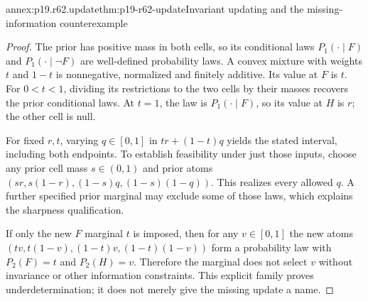 \begin{annexitem}{annex:p19.r62.update}{thm:p19-r62-update}{Invariant updating and the missing-information counterexample}
\begin{proof}
The prior has positive mass in both cells, so its conditional laws
\(P_1(\cdot\mid F)\) and \(P_1(\cdot\mid\neg F)\) are
well-defined probability laws. A convex mixture with weights \(t\)
and \(1-t\) is nonnegative, normalized and finitely additive.
Its value at \(F\) is \(t\). For \(0<t<1\), dividing its
restrictions to the two cells by their masses recovers the prior
conditional laws. At \(t=1\), the law is \(P_1(\cdot\mid F)\),
so its value at \(H\) is \(r\); the other cell is null.

For fixed \(r,t\), varying \(q\in[0,1]\) in
\(tr+(1-t)q\) yields the stated interval, including both endpoints.
To establish feasibility under just those inputs, choose any prior
cell mass \(s\in(0,1)\) and prior atoms
\((sr,s(1-r),(1-s)q,(1-s)(1-q))\). This realizes every
allowed \(q\). A further specified prior marginal may exclude some
of those laws, which explains the sharpness qualification.

If only the new \(F\) marginal \(t\) is imposed, then for any
\(v\in[0,1]\) the new atoms
\((tv,t(1-v),(1-t)v,(1-t)(1-v))\) form a probability law
with \(P_2(F)=t\) and \(P_2(H)=v\).
Therefore the marginal does not select \(v\) without invariance or
other information constraints. This explicit family proves
underdetermination; it does not merely give the missing update a name.
\end{proof}
\end{annexitem}
